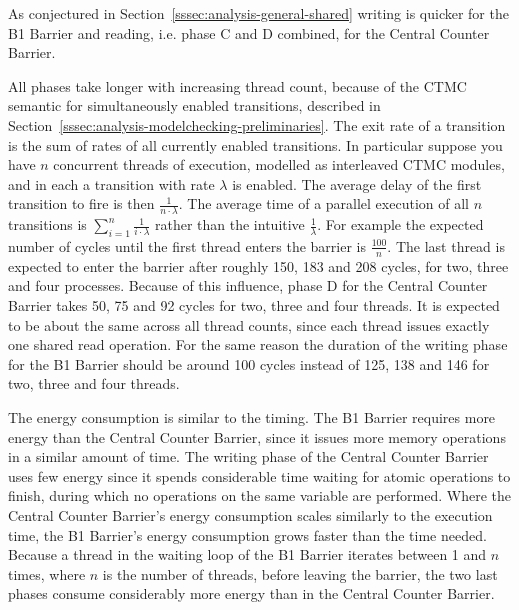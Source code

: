 \documentclass[a4paper, 10pt]{article}
\begin{document}
As conjectured in Section~\ref{sssec:analysis-general-shared} writing is quicker for the B1 Barrier and reading, i.e. phase C and D combined, for the Central Counter Barrier.

All phases take longer with increasing thread count, because of the CTMC semantic for simultaneously enabled transitions, described in Section~\ref{sssec:analysis-modelchecking-preliminaries}. The exit rate of a transition is the sum of rates of all currently enabled transitions.
In particular suppose you have $n$ concurrent threads of execution, modelled as interleaved CTMC modules, and in each a transition with rate $\lambda$ is enabled. The average delay of the first transition to fire is then $\frac{1}{n \cdot \lambda}$. The average time of a parallel execution of all $n$ transitions is $\sum_{i=1}^{n} \frac{1}{i \cdot \lambda}$ rather than the intuitive $\frac{1}{\lambda}$.
For example the expected number of cycles until the first thread enters the barrier is $\frac{100}{n}$. The last thread is expected to enter the barrier after roughly 150, 183 and 208 cycles, for two, three and four processes.
Because of this influence, phase D for the Central Counter Barrier takes 50, 75 and 92 cycles for two, three and four threads. It is expected to be about the same across all thread counts, since each thread issues exactly one shared read operation.
For the same reason the duration of the writing phase for the B1 Barrier should be around 100 cycles instead of 125, 138 and 146 for two, three and four threads.

The energy consumption is similar to the timing.
The B1 Barrier requires more energy than the Central Counter Barrier, since it issues more memory operations in a similar amount of time.
The writing phase of the Central Counter Barrier uses few energy since it spends considerable time waiting for atomic operations to finish, during which no operations on the same variable are performed.
Where the Central Counter Barrier's energy consumption scales similarly to the execution time, the B1 Barrier's energy consumption grows faster than the time needed.
Because a thread in the waiting loop of the B1 Barrier iterates between 1 and $n$ times, where $n$ is the number of threads, before leaving the barrier, the two last phases consume considerably more energy than in the Central Counter Barrier.
\end{document}
